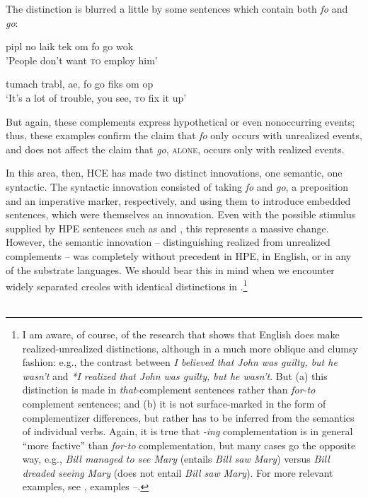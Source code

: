 The distinction is blurred a little by some sentences which contain both \textit{fo} and \textit{go}:

\ea\label{ex:67}
 pipl no laik tek om fo go wok\\
\glt  'People don't want \textsc{to} employ him'
\z

\ea\label{ex:68}
 tumach trabl, ae, fo go fiks om op \\
\glt  `It's a lot of trouble, you see, \textsc{to} fix it up'
\z

\noindent But again, these complements express hypothetical or even nonoccur\-ring events; thus, these examples confirm the claim that \textit{fo} only occurs with unrealized events, and does not affect the claim that \textit{go}, \textsc{alone}, occurs only with realized events.

In this area, then, HCE has made two distinct innovations, one semantic, one syntactic. The syntactic innovation consisted of taking \textit{fo} and \textit{go}, a preposition and an imperative marker, respectively, and using them to introduce embedded sentences, which were themselves an innovation. Even with the possible stimulus supplied by HPE sen\-tences such as  and , this represents a massive change. However, the semantic innovation -- distinguishing realized from unrealized com\-plements -- was completely without precedent in HPE, in English, or in any of the substrate languages. We should bear this in mind when we encounter widely separated creoles with identical distinctions in .\footnote{I am aware, of course, of the research that shows that English does make realized-unrealized distinctions, although in a much more oblique and clumsy fashion: e.g., the contrast between \textit{I believed that John was guilty, but he wasn't} and \textit{*I realized that John was guilty,  but he wasn't}. But (a) this distinction is made in \textit{that}-complement sentences rather than \textit{for-to} complement sentences; and (b) it is not surface-marked in the form of complementizer differences, but rather has to be inferred from the semantics of individual verbs. Again, it is true that \textit{-ing} complementation is in general ``more factive'' than \textit{for-to} complementation, but many cases go the opposite way, e.g., \textit{Bill managed to see Mary} (entails \textit{Bill saw Mary}) versus \textit{Bill dreaded seeing Mary} (does not entail \textit{Bill saw Mary}). For more relevant exam\-ples, see , examples --.}\\\\


